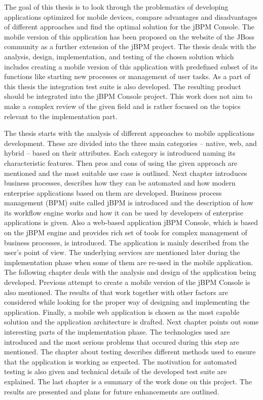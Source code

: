 \documentclass[12pt,oneside,final]{fithesis2}
\begin{document}
The goal of this thesis is to look through the problematics of developing applications optimized for mobile devices, compare advantages and disadvantages of different approaches and find the optimal solution for the jBPM Console\footnotemark{}.
The mobile version of this application has been proposed on the website of the JBoss community\footnotemark{} as a further extension of the jBPM project\footnotemark{}.
The thesis deals with the analysis, design, implementation, and testing of the chosen solution which includes creating a mobile version of this application with predefined subset of its functions like starting new processes or management of user tasks.
As a part of this thesis the integration test suite is also developed.
The resulting product should be integrated into the jBPM Console project.
This work does not aim to make a complex review of the given field and is rather focused on the topics relevant to the implementation part.

The thesis starts with the analysis of different approaches to mobile applications development.
These are divided into the three main categories -- native, web, and hybrid -- based on their attributes.
Each category is introduced naming its characteristic features.
Then pros and cons of using the given approach are mentioned and the most suitable use case is outlined.
Next chapter introduces business processes, describes how they can be automated and how modern enterprise applications based on them are developed.
Business process management (BPM) suite called jBPM is introduced and the description of how its workflow engine works and how it can be used by developers of enterprise applications is given.
Also a web-based application jBPM Console, which is based on the jBPM engine and provides rich set of tools for complex management of business processes, is introduced.
The application is mainly described from the user's point of view.
The underlying services are mentioned later during the implementation phase when some of them are re-used in the mobile application.
The following chapter deals with the analysis and design of the application being developed.
Previous attempt to create a mobile version of the jBPM Console is also mentioned.
The results of that work together with other factors are considered while looking for the proper way of designing and implementing the application.
Finally, a mobile web application is chosen as the most capable solution and the application architecture is drafted.
Next chapter points out some interesting parts of the implementation phase.
The technologies used are introduced and the most serious problems that occured during this step are mentioned.
The chapter about testing describes different methods used to ensure that the application is working as expected.
The motivation for automated testing is also given and technical details of the developed test suite are explained.
The last chapter is a summary of the work done on this project.
The results are presented and plans for future enhancements are outlined.
\end{document}
